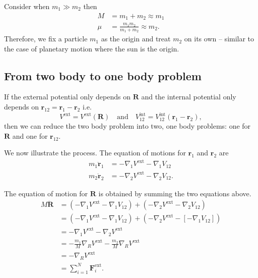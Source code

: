 \documentclass[12pt, a4paper]{article}
\begin{document}
\begin{mdremark}
    Consider when \(m_1 \gg m_2\) then 
    \[\begin{aligned}
        M &= m_1 +m_2 \approx m_1 \\
        \mu &= \frac{m_1 m_2}{m_1+m_2} \approx m_2.
    \end{aligned}\]
    Therefore, we fix a particle \(m_1\) as the origin and treat \(m_2\) on its own -- similar to the case of planetary motion where the sun is the origin.
\end{mdremark}

\subsection{From two body to one body problem}

\begin{mdthm}
    If the external potential only depends on \(\bm{R}\) and the internal potential only depends on \(\bm{r}_{12}=\bm{r}_1-\bm{r}_2\) i.e. 
    \[V^{\text{ext}} = V^{\text{ext}}(\bm{R}) \quad \text{and} \quad V_{12}^{\text{int}} = V_{12}^{\text{int}}(\bm{r}_1 - \bm{r}_2),\]
    then we can reduce the two body problem into two, one body problems: one for \(\bm{R}\) and one for \(\bm{r}_{12}\).
\end{mdthm}

We now illustrate the process. The equation of motions for \(\bm{r}_1\) and \(\bm{r}_2\) are 
\[\begin{aligned}
    m_1 \bm{\ddot{r}}_1 &= -\nabla_1 V^{\text{ext}} - \nabla_1 V_{12} \\
    m_2 \bm{\ddot{r}}_2 &= -\nabla_2 V^{\text{ext}} - \nabla_2 V_{12}.
\end{aligned}\]

The equation of motion for \(\bm{R}\) is obtained by summing the two equations above. 
\[\begin{aligned}
    M\bm{\ddot{R}} &= \left( -\nabla_1 V^{\text{ext}} - \nabla_1 V_{12} \right) + \left( -\nabla_2 V^{\text{ext}} - \nabla_2 V_{12} \right) \\
    &= \left( -\nabla_1 V^{\text{ext}} - \nabla_1 V_{12} \right) + \left( -\nabla_2 V^{\text{ext}} - [-\nabla_1 V_{12}] \right) \\
    &= -\nabla_1 V^{\text{ext}}-\nabla_2 V^{\text{ext}} \\
    &= -\frac{m_1}{M} \nabla_R V^{\text{ext}} - \frac{m_2}{M} \nabla_R V^{\text{ext}} \\
    &= - \nabla_R V^{\text{ext}} \\
    &= \sum_{i=1}^{N} \bm{F}_i^{\text{ext}}.
\end{aligned}\]
\end{document}
